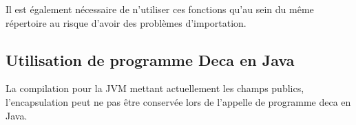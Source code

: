 \documentclass[12pt, a4paper, one side]{article}
\begin{document}
    Il est également nécessaire de n'utiliser ces fonctions qu'au sein du même répertoire au risque d'avoir des problèmes d'importation.

    \subsection{Utilisation de programme Deca en Java}
    La compilation pour la JVM mettant actuellement les champs publics, l'encapsulation peut ne pas être conservée lors de l'appelle de programme deca en Java.

    \newpage
    \printbibliography
\end{document}
